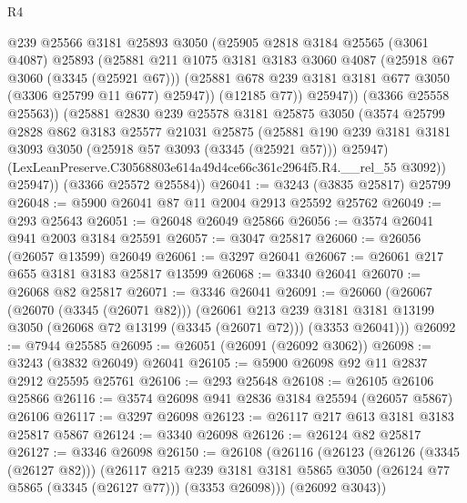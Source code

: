 \begin{lexlean}{R4}
\begin{coremodule}
              @239
              @25566
              @3181
              @25893
              @3050
              (@25905
                @2818
                @3184
                @25565
                (@3061 @4087)
                @25893
                (@25881
                  @211
                  @1075
                  @3181
                  @3183
                  @3060
                  @4087
                  (@25918 @67 @3060 (@3345 (@25921 @67)))
                  (@25881 @678 @239 @3181 @3181 @677 @3050 (@3306 @25799 @11 @677) @25947))
                (@12185 @77))
              @25947))
          (@3366 @25558 @25563))
        (@25881
          @2830
          @239
          @25578
          @3181
          @25875
          @3050
          (@3574
            @25799
            @2828
            @862
            @3183
            @25577
            @21031
            @25875
            (@25881
              @190
              @239
              @3181
              @3181
              @3093
              @3050
              (@25918 @57 @3093 (@3345 (@25921 @57)))
              @25947)
            (LexLeanPreserve.C30568803e614a49d4ce66c361c2964f5.R4.__rel_55 @3092))
          @25947))
      (@3366 @25572 @25584))
@26041 := @3243 (@3835 @25817) @25799
@26048 := @5900 @26041 @87 @11 @2004 @2913 @25592 @25762
@26049 := @293 @25643
@26051 := @26048 @26049 @25866
@26056 := @3574 @26041 @941 @2003 @3184 @25591
@26057 := @3047 @25817
@26060 := @26056 (@26057 @13599) @26049
@26061 := @3297 @26041
@26067 := @26061 @217 @655 @3181 @3183 @25817 @13599
@26068 := @3340 @26041
@26070 := @26068 @82 @25817
@26071 := @3346 @26041
@26091 := @26060
    (@26067
      (@26070 (@3345 (@26071 @82)))
      (@26061
        @213
        @239
        @3181
        @3181
        @13199
        @3050
        (@26068 @72 @13199 (@3345 (@26071 @72)))
        (@3353 @26041)))
@26092 := @7944 @25585
@26095 := @26051 (@26091 (@26092 @3062))
@26098 := @3243 (@3832 @26049) @26041
@26105 := @5900 @26098 @92 @11 @2837 @2912 @25595 @25761
@26106 := @293 @25648
@26108 := @26105 @26106 @25866
@26116 := @3574 @26098 @941 @2836 @3184 @25594 (@26057 @5867) @26106
@26117 := @3297 @26098
@26123 := @26117 @217 @613 @3181 @3183 @25817 @5867
@26124 := @3340 @26098
@26126 := @26124 @82 @25817
@26127 := @3346 @26098
@26150 := @26108
    (@26116
      (@26123
        (@26126 (@3345 (@26127 @82)))
        (@26117
          @215
          @239
          @3181
          @3181
          @5865
          @3050
          (@26124 @77 @5865 (@3345 (@26127 @77)))
          (@3353 @26098)))
      (@26092 @3043))

\end{coremodule}
\end{lexlean}
